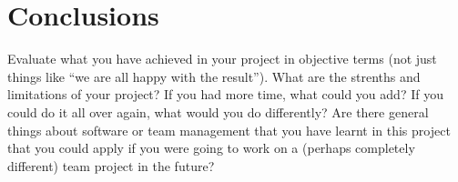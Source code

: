 
\chapter{Conclusions}
\label{cha:conclusions}


Evaluate what you have achieved in your project in objective terms
(not just things like ``we are all happy with the result''). What
are the strenths and limitations of your project? If you had more
time, what could you add? If you could do it all over again, what
would you do differently? Are there general things about software or
team management that you have learnt in this project that you could
apply if you were going to work on a (perhaps completely different)
team project in the future?

